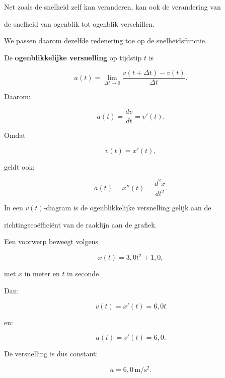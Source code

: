 \documentclass{ximera}
\begin{document}




Net zoals de snelheid zelf kan veranderen, kan ook de verandering van

de snelheid van ogenblik tot ogenblik verschillen.

We passen daarom dezelfde redenering toe op de snelheidsfunctie.

\begin{definitie}

De \textbf{ogenblikkelijke versnelling} op tijdstip $t$ is

\[\boxed{ a(t) = \lim_{\Delta t\to0} \frac{v(t+\Delta t)-v(t)}{\Delta t}. }\]

Daarom:

\[\boxed{ a(t)=\frac{dv}{dt}=v'(t). }\]

Omdat

\[v(t)=x'(t),\]

geldt ook:

\[\boxed{ a(t)=x''(t)=\frac{d^2x}{dt^2}. }\]

\end{definitie}

\begin{eigenschap}

In een $v(t)$-diagram is de ogenblikkelijke versnelling gelijk aan de

richtingscoëfficiënt van de raaklijn aan de grafiek.

\end{eigenschap}

\begin{voorbeeld}

Een voorwerp beweegt volgens

\[x(t)=3,0t^2+1,0,\]

met $x$ in meter en $t$ in seconde.

Dan:

\[v(t)=x'(t)=6,0t\]

en:

\[a(t)=v'(t)=6,0.\]

De versnelling is dus constant:

\[\boxed{a=6,0\,\mathrm{m/s^2}.}\]

\end{voorbeeld}
\end{document}
